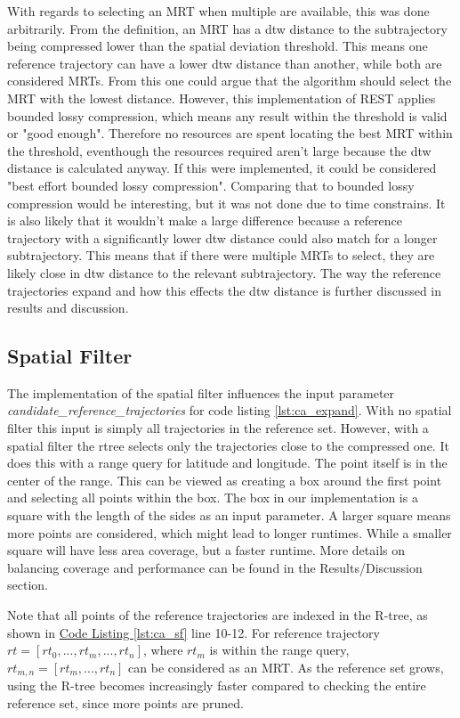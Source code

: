 With regards to selecting an MRT when multiple are available, this was done arbitrarily. From the definition, an MRT has a dtw distance to the subtrajectory being compressed lower than the spatial deviation threshold. This means one reference trajectory can have a lower dtw distance than another, while both are considered MRTs. From this one could argue that the algorithm should select the MRT with the lowest distance. However, this implementation of REST applies bounded lossy compression, which means any result within the threshold is valid or "good enough". Therefore no resources are spent locating the best MRT within the threshold, eventhough the resources required aren't large because the dtw distance is calculated anyway. If this were implemented, it could be considered "best effort bounded lossy compression". Comparing that to bounded lossy compression would be interesting, but it was not done due to time constrains. It is also likely that it wouldn't make a large difference because a reference trajectory with a significantly lower dtw distance could also match for a longer subtrajectory. This means that if there were multiple MRTs to select, they are likely close in dtw distance to the relevant subtrajectory. The way the reference trajectories expand and how this effects the dtw distance is further discussed in results and discussion. %

\subsection{Spatial Filter}
The implementation of the spatial filter influences the input parameter \break \textit{candidate\_reference\_trajectories} for code listing \ref{lst:ca_expand}. With no spatial filter this input is simply all trajectories in the reference set. However, with a spatial filter the rtree selects only the trajectories close to the compressed one. It does this with a range query for latitude and longitude. The point itself is in the center of the range. This can be viewed as creating a box around the first point and selecting all points within the box. The box in our implementation is a square with the length of the sides as an input parameter. A larger square means more points are considered, which might lead to longer runtimes. While a smaller square will have less area coverage, but a faster runtime. More details on balancing coverage and performance can be found in the Results/Discussion section. %

Note that all points of the reference trajectories are indexed in the R-tree, as shown in \hyperref[lst:ca_sf]{Code Listing \ref{lst:ca_sf}} line 10-12. For reference trajectory $rt = [rt_0, ..., rt_m, ..., rt_n]$, where $rt_m$ is within the range query, $rt_{m,n} = [rt_m, ..., rt_n]$ can be considered as an MRT. As the reference set grows, using the R-tree becomes increasingly faster compared to checking the entire reference set, since more points are pruned.

